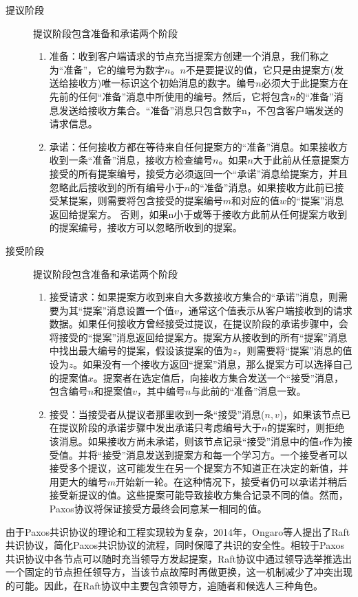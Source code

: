 \begin{description}
  \item[提议阶段] 提议阶段包含准备和承诺两个阶段
  \begin{enumerate}
    \item 准备：收到客户端请求的节点充当提案方创建一个消息，我们称之为“准备”，它的编号为数字$n$。$n$不是要提议的值，它只是由提案方(发送给接收方)唯一标识这个初始消息的数字。编号$n$必须大于此提案方在先前的任何“准备”消息中所使用的编号。然后，它将包含$n$的“准备”消息发送给接收方集合。“准备”消息只包含数字n，不包含客户端发送的请求信息。
    \item 承诺：任何接收方都在等待来自任何提案方的“准备”消息。如果接收方收到一条“准备”消息，接收方检查编号$n$。如果$n$大于此前从任意提案方接受的所有提案编号，接受方必须返回一个“承诺”消息给提案方，并且忽略此后接收到的所有编号小于$n$的“准备”消息。如果接收方此前已接受某提案，则需要将包含接受的提案编号$m$和对应的值$w$的“提案”消息返回给提案方。
否则，如果n小于或等于接收方此前从任何提案方收到的提案编号，接收方可以忽略所收到的提案。
  \end{enumerate}

  \item[接受阶段] 提议阶段包含准备和承诺两个阶段
  \begin{enumerate}
    \item 接受请求：如果提案方收到来自大多数接收方集合的“承诺”消息，则需要为其“提案”消息设置一个值$v$，通常这个值表示从客户端接收到的请求数据。如果任何接收方曾经接受过提议，在提议阶段的承诺步骤中，会将接受的“提案”消息返回给提案方。提案方从接收到的所有“提案”消息中找出最大编号的提案，假设该提案的值为$z$，则需要将“提案”消息的值设为$z$。如果没有一个接收方返回“提案”消息，那么提案方可以选择自己的提案值$x$。提案者在选定值后，向接收方集合发送一个“接受”消息，包含编号$n$和提案值$v$，其中编号$n$与此前的“准备”消息一致。
    \item 接受：当接受者从提议者那里收到一条“接受”消息($n,v$)，如果该节点已在提议阶段的承诺步骤中发出承诺只考虑编号大于$n$的提案时，则拒绝该消息。如果接收方尚未承诺，则该节点记录“接受”消息中的值$v$作为接受值。并将“接受”消息发送到提案方和每一个学习方。一个接受者可以接受多个提议，这可能发生在另一个提案方不知道正在决定的新值，并用更大的编号$m$开始新一轮。在这种情况下，接受者仍可以承诺并稍后接受新提议的值。这些提案可能导致接收方集合记录不同的值。然而，Paxos协议将保证接受方最终会同意某一相同的值。
  \end{enumerate}
\end{description}

由于Paxos共识协议的理论和工程实现较为复杂，2014年，Ongaro等人提出了Raft共识协议，简化Paxos共识协议的流程，同时保障了共识的安全性。相较于Paxos共识协议中各节点可以随时充当领导方发起提案，Raft协议中通过领导选举推选出一个固定的节点担任领导方，当该节点故障时再做更换，这一机制减少了冲突出现的可能。因此，在Raft协议中主要包含领导方，追随者和候选人三种角色。

